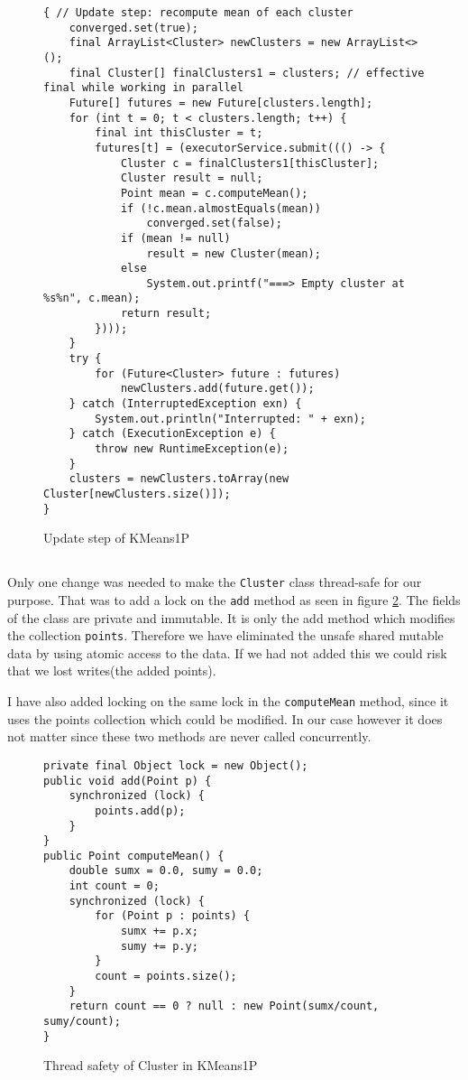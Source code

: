 \begin{figure}
\begin{lstlisting}
{ // Update step: recompute mean of each cluster
    converged.set(true);
    final ArrayList<Cluster> newClusters = new ArrayList<>();
    final Cluster[] finalClusters1 = clusters; // effective final while working in parallel
    Future[] futures = new Future[clusters.length];
    for (int t = 0; t < clusters.length; t++) {
        final int thisCluster = t;
        futures[t] = (executorService.submit((() -> {
            Cluster c = finalClusters1[thisCluster];
            Cluster result = null;
            Point mean = c.computeMean();
            if (!c.mean.almostEquals(mean))
                converged.set(false);
            if (mean != null)
                result = new Cluster(mean);
            else
                System.out.printf("===> Empty cluster at %s%n", c.mean);
            return result;
        })));
    }
    try {
        for (Future<Cluster> future : futures)
            newClusters.add(future.get());
    } catch (InterruptedException exn) {
        System.out.println("Interrupted: " + exn);
    } catch (ExecutionException e) {
        throw new RuntimeException(e);
    }
    clusters = newClusters.toArray(new Cluster[newClusters.size()]);
}
\end{lstlisting}
\caption{Update step of KMeans1P}
\label{code:1:3}
\end{figure}

\subsection{}\label{sec:1:4}
Only one change was needed to make the \texttt{Cluster} class thread-safe for our purpose. That was to add a lock on the \texttt{add} method as seen in figure \ref{code:1:4}. The fields of the class are private and immutable. It is only the add method which modifies the collection \texttt{points}. Therefore we have eliminated the unsafe shared mutable data by using atomic access to the data. If we had not added this we could risk that we lost writes(the added points).

I have also added locking on the same lock in the \texttt{computeMean} method, since it uses the points collection which could be modified. In our case however it does not matter since these two methods are never called concurrently.

\begin{figure}
\begin{lstlisting}
private final Object lock = new Object();
public void add(Point p) {
    synchronized (lock) {
        points.add(p);
    }
}
public Point computeMean() {
    double sumx = 0.0, sumy = 0.0;
    int count = 0;
    synchronized (lock) {
        for (Point p : points) {
            sumx += p.x;
            sumy += p.y;
        }
        count = points.size();
    }
    return count == 0 ? null : new Point(sumx/count, sumy/count);
}
\end{lstlisting}
\caption{Thread safety of Cluster in KMeans1P}
\label{code:1:4}
\end{figure}

